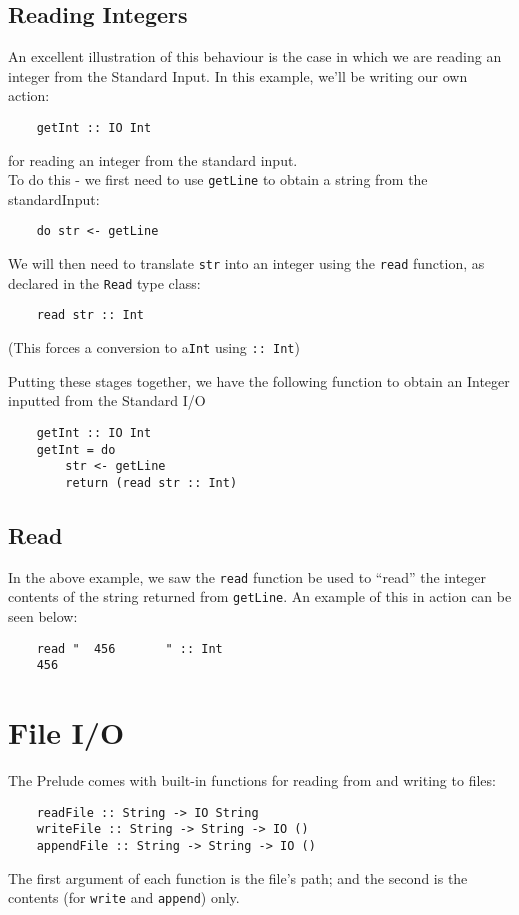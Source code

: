 \subsection{Reading Integers}
An excellent illustration of this behaviour is the case in which we are reading an integer from the Standard Input. In this example, we'll be writing our own action:
\begin{verbatim}
    getInt :: IO Int
\end{verbatim}
for reading an integer from the standard input.\\

To do this - we first need to use \verb|getLine| to obtain a string from the standardInput:
\begin{verbatim}
    do str <- getLine 
\end{verbatim}
We will then need to translate \verb|str| into an integer using the \verb|read| function, as declared in the \verb|Read| type class:
\begin{verbatim}
    read str :: Int
\end{verbatim}
(This forces a conversion to a\verb|Int| using \verb|:: Int|)

Putting these stages together, we have the following function to obtain an Integer inputted from the Standard I/O
\begin{verbatim}
    getInt :: IO Int
    getInt = do
        str <- getLine
        return (read str :: Int)
\end{verbatim}

\subsection{Read}
In the above example, we saw the \verb|read| function be used to ``read'' the integer contents of the string returned from \verb|getLine|. An example of this in action can be seen below:
\begin{verbatim}
    read "  456       " :: Int
    456
\end{verbatim}

\section{File I/O}
The Prelude comes with built-in functions for reading from and writing to files:
\begin{verbatim}
    readFile :: String -> IO String
    writeFile :: String -> String -> IO ()
    appendFile :: String -> String -> IO ()
\end{verbatim}
The first argument of each function is the file's path; and the second is the contents (for \verb|write| and \verb|append|) only. \\

